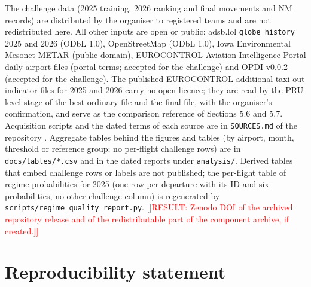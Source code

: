 \documentclass[11pt,a4paper]{article}
\newcommand{\placeholder}[1]{\textcolor{red}{[[RESULT:#1]]}}
\begin{document}
The challenge data (2025 training, 2026 ranking and final movements and NM records) are distributed by the organiser to registered teams and are not redistributed here. All other inputs are open or public: adsb.lol \texttt{globe\_\allowbreak{}history} 2025 and 2026 (ODbL 1.0), OpenStreetMap (ODbL 1.0), Iowa Environmental Mesonet METAR (public domain), EUROCONTROL Aviation Intelligence Portal daily airport files (portal terms; accepted for the challenge) and OPDI v0.0.2 (accepted for the challenge). The published EUROCONTROL additional taxi-out indicator files for 2025 and 2026 \autocite{eurocontrol2026atxotdata} carry no open licence; they are read by the PRU level stage of the best ordinary file and the final file, with the organiser's confirmation, and serve as the comparison reference of Sections 5.6 and 5.7. Acquisition scripts and the dated terms of each source are in \texttt{SOURCES.md} of the repository \autocite{kolomiiets2026repo}. Aggregate tables behind the figures and tables (by airport, month, threshold or reference group; no per-flight challenge rows) are in \texttt{docs/\allowbreak{}tables/\allowbreak{}*.csv} and in the dated reports under \texttt{analysis/\allowbreak{}}. Derived tables that embed challenge rows or labels are not published; the per-flight table of regime probabilities for 2025 (one row per departure with its ID and six probabilities, no other challenge column) is regenerated by \texttt{scripts/\allowbreak{}regime\_\allowbreak{}quality\_\allowbreak{}report.py}. \placeholder{ Zenodo DOI of the archived repository release and of the redistributable part of the component archive, if created.}

\section*{Reproducibility statement}\label{reproducibility-statement}
\end{document}
